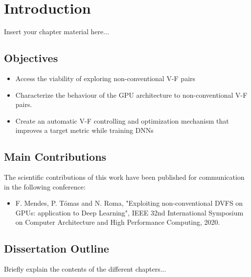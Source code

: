 
\chapter{Introduction}
\label{chapter:introduction}

Insert your chapter material here...




\section{Objectives}
\label{section:objectives}

\begin{itemize}
\item Access the viability of exploring non-conventional V-F pairs
\item Characterize the behaviour of the GPU architecture to non-conventional V-F pairs.
\item Create an automatic V-F controlling and optimization mechanism that improves a target metric while training DNNs
\end{itemize}


\section{Main Contributions}
\label{section:main_contri}

The scientiﬁc contributions of this work have been published for communication in the following conference:

\begin{itemize}
    \item F. Mendes, P. Tómas and N. Roma, "Exploiting non-conventional DVFS on GPUs: application to Deep Learning", IEEE 32nd International Symposium on Computer Architecture and High Performance Computing, 2020.
\end{itemize}


\section{Dissertation Outline}
\label{section:outline}

Briefly explain the contents of the different chapters...

